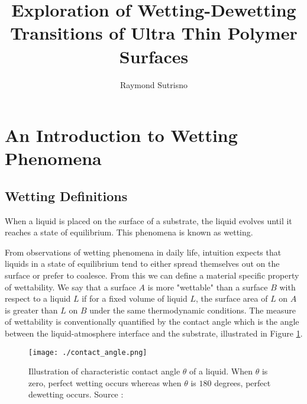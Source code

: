 \documentclass{article}
\title{
Exploration of Wetting-Dewetting Transitions of Ultra Thin Polymer Surfaces
}
\author{Raymond Sutrisno}
\begin{document}
\maketitle


\section{An Introduction to Wetting Phenomena} \label{sec1}

\subsection{Wetting Definitions}
When a liquid is placed on the surface of a substrate, the liquid evolves until it reaches a state of equilibrium. This phenomena is known as wetting.

From observations of wetting phenomena in daily life, intuition expects that liquids in a state of equilibrium tend to either spread themselves out on the surface or prefer to coalesce. From this we can define a material specific property of wettability. We say that a surface $A$ is more "wettable" than a surface $B$ with respect to a liquid $L$ if for a fixed volume of liquid $L$, the surface area of $L$ on $A$ is greater than $L$ on $B$ under the same thermodynamic conditions. The measure of wettability is conventionally quantified by the contact angle which is the angle between the liquid-atmosphere interface and the substrate, illustrated in Figure \ref{fig:contact_angle}.

\begin{figure}[H]
\caption{Illustration of characteristic contact angle $\theta$ of a liquid. When $\theta$ is zero, perfect wetting occurs whereas when $\theta$ is $180$ degrees, perfect dewetting occurs. Source : \cite{wikipediaEN:contactangleschem}}
\centering
\texttt{[image: ./contact\_angle.png]}
\label{fig:contact_angle}
\end{figure}
\end{document}
